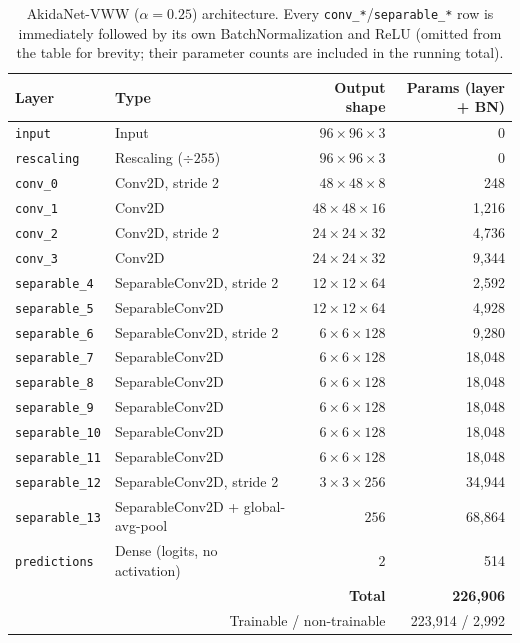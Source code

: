 \documentclass[11pt]{article}
\newcommand{\code}[1]{\texttt{#1}}
\begin{document}
\begin{table}[H]
\centering
\caption{AkidaNet-VWW ($\alpha=0.25$) architecture. Every \code{conv\_*}/\code{separable\_*} row is immediately followed by its own BatchNormalization and ReLU (omitted from the table for brevity; their parameter counts are included in the running total).}
\label{tab:arch}
\begin{tabular}{@{}llrr@{}}
\toprule
Layer & Type & Output shape & Params (layer + BN) \\
\midrule
\code{input} & Input & $96\times96\times3$ & 0 \\
\code{rescaling} & Rescaling ($\div 255$) & $96\times96\times3$ & 0 \\
\code{conv\_0} & Conv2D, stride 2 & $48\times48\times8$ & 248 \\
\code{conv\_1} & Conv2D & $48\times48\times16$ & 1{,}216 \\
\code{conv\_2} & Conv2D, stride 2 & $24\times24\times32$ & 4{,}736 \\
\code{conv\_3} & Conv2D & $24\times24\times32$ & 9{,}344 \\
\code{separable\_4} & SeparableConv2D, stride 2 & $12\times12\times64$ & 2{,}592 \\
\code{separable\_5} & SeparableConv2D & $12\times12\times64$ & 4{,}928 \\
\code{separable\_6} & SeparableConv2D, stride 2 & $6\times6\times128$ & 9{,}280 \\
\code{separable\_7} & SeparableConv2D & $6\times6\times128$ & 18{,}048 \\
\code{separable\_8} & SeparableConv2D & $6\times6\times128$ & 18{,}048 \\
\code{separable\_9} & SeparableConv2D & $6\times6\times128$ & 18{,}048 \\
\code{separable\_10} & SeparableConv2D & $6\times6\times128$ & 18{,}048 \\
\code{separable\_11} & SeparableConv2D & $6\times6\times128$ & 18{,}048 \\
\code{separable\_12} & SeparableConv2D, stride 2 & $3\times3\times256$ & 34{,}944 \\
\code{separable\_13} & SeparableConv2D + global-avg-pool & $256$ & 68{,}864 \\
\code{predictions} & Dense (logits, no activation) & $2$ & 514 \\
\midrule
\multicolumn{3}{r}{\textbf{Total}} & \textbf{226{,}906} \\
\multicolumn{3}{r}{Trainable / non-trainable} & 223{,}914 / 2{,}992 \\
\bottomrule
\end{tabular}
\end{table}
\end{document}
